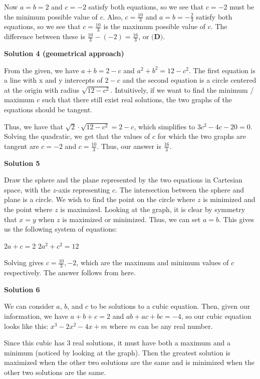 \begin{enumerate}
 Now $a=b=2$ and $c=-2$ satisfy both equations, so we see that $c=-2$ must be the minimum possible value of $c$. Also, $c=\frac{10}{3}$ and $a=b=-\frac{2}{3}$ satisfy both equations, so we see that $c=\frac{10}{3}$ is the maximum possible value of $c$. The difference between these is $\frac{10}{3}-(-2)=\frac{16}{3}$, or $\boxed{\textbf{(D)}}$.

 



\textbf{Solution 4 (geometrical approach)}

From the given, we have $a + b = 2 - c$ and $a^2 + b^2 = 12 - c^2$. The first equation is a line with x and y intercepts of $2-c$ and the second equation is a circle centered at the origin with radius $\sqrt{12-c^2}$. Intuitively, if we want to find the minimum / maximum $c$ such that there still exist real solutions, the two graphs of the equations should be tangent.

 Thus, we have that $\sqrt{2} \cdot \sqrt{12-c^2} = 2-c$, which simplifies to $3c^2-4c-20=0$. Solving the quadratic, we get that the values of $c$ for which the two graphs are tangent are $c=-2$ and $c=\frac{10}{3}$. Thus, our answer is $\boxed{\frac{16}{3}}$.

 



\textbf{Solution 5}

Draw the sphere and the plane represented by the two equations in Cartesian space, with the $z$-axis representing $c$. The intersection between the sphere and plane is a circle. We wish to find the point on the circle where $z$ is minimized and the point where $z$ is maximized. Looking at the graph, it is clear by symmetry that $x = y$ when $z$ is maximized or minimized. Thus, we can set $a = b$. This gives us the following system of equations:

 $2a + c = 2$
$2a^2 + c^2 = 12$

 Solving gives $c = \frac{10}{3}, -2$, which are the maximum and minimum values of $c$ respectively. The answer follows from here.

 



\textbf{Solution 6}

We can consider $a$, $b$, and $c$ to be solutions to a cubic equation. Then, given our information, we have $a+b+c=2$ and $ab+ac+bc=-4$, so our cubic equation looks like this: $x^3-2x^2-4x+m$ where $m$ can be any real number. 

 Since this cubic has $3$ real solutions, it must have both a maximum and a minimum (noticed by looking at the graph). Then the greatest solution is maximized when the other two solutions are the same and is minimized when the other two solutions are the same. 


\end{enumerate}
